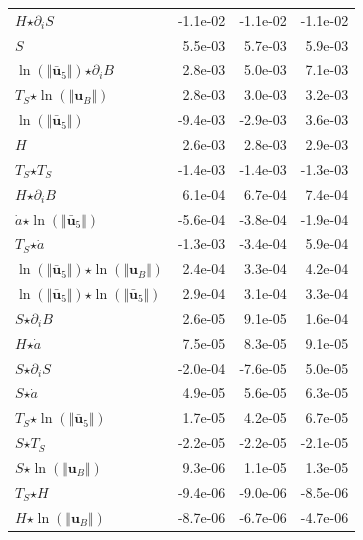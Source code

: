\begin{table}[H]
\begin{tabular}{l|r|r|r}
  $H$$ \star $$\partial_i S$ & -1.1e-02 & -1.1e-02 & -1.1e-02 \\
  $S$ & 5.5e-03 & 5.7e-03 & 5.9e-03 \\
  $\ln\left( \Vert \bar{\mathbf{u}}_{5} \Vert \right)$$ \star $$\partial_i B$ & 2.8e-03 & 5.0e-03 & 7.1e-03 \\
  $T_S$$ \star $$\ln\left( \Vert \mathbf{u}_B \Vert \right)$ & 2.8e-03 & 3.0e-03 & 3.2e-03 \\
  \color{red}$\ln\left( \Vert \bar{\mathbf{u}}_{5} \Vert \right)$ & \color{red}-9.4e-03 & \color{red}-2.9e-03 & \color{red}3.6e-03 \\
  $H$ & 2.6e-03 & 2.8e-03 & 2.9e-03 \\
  $T_S$$ \star $$T_S$ & -1.4e-03 & -1.4e-03 & -1.3e-03 \\
  $H$$ \star $$\partial_i B$ & 6.1e-04 & 6.7e-04 & 7.4e-04 \\
  $\dot{a}$$ \star $$\ln\left( \Vert \bar{\mathbf{u}}_{5} \Vert \right)$ & -5.6e-04 & -3.8e-04 & -1.9e-04 \\
  \color{red}$T_S$$ \star $$\dot{a}$ & \color{red}-1.3e-03 & \color{red}-3.4e-04 & \color{red}5.9e-04 \\
  $\ln\left( \Vert \bar{\mathbf{u}}_{5} \Vert \right)$$ \star $$\ln\left( \Vert \mathbf{u}_B \Vert \right)$ & 2.4e-04 & 3.3e-04 & 4.2e-04 \\
  $\ln\left( \Vert \bar{\mathbf{u}}_{5} \Vert \right)$$ \star $$\ln\left( \Vert \bar{\mathbf{u}}_{5} \Vert \right)$ & 2.9e-04 & 3.1e-04 & 3.3e-04 \\
  $S$$ \star $$\partial_i B$ & 2.6e-05 & 9.1e-05 & 1.6e-04 \\
  $H$$ \star $$\dot{a}$ & 7.5e-05 & 8.3e-05 & 9.1e-05 \\
  \color{red}$S$$ \star $$\partial_i S$ & \color{red}-2.0e-04 & \color{red}-7.6e-05 & \color{red}5.0e-05 \\
  $S$$ \star $$\dot{a}$ & 4.9e-05 & 5.6e-05 & 6.3e-05 \\
  $T_S$$ \star $$\ln\left( \Vert \bar{\mathbf{u}}_{5} \Vert \right)$ & 1.7e-05 & 4.2e-05 & 6.7e-05 \\
  $S$$ \star $$T_S$ & -2.2e-05 & -2.2e-05 & -2.1e-05 \\
  $S$$ \star $$\ln\left( \Vert \mathbf{u}_B \Vert \right)$ & 9.3e-06 & 1.1e-05 & 1.3e-05 \\
  $T_S$$ \star $$H$ & -9.4e-06 & -9.0e-06 & -8.5e-06 \\
  $H$$ \star $$\ln\left( \Vert \mathbf{u}_B \Vert \right)$ & -8.7e-06 & -6.7e-06 & -4.7e-06 \\

\end{tabular}
\end{table}
